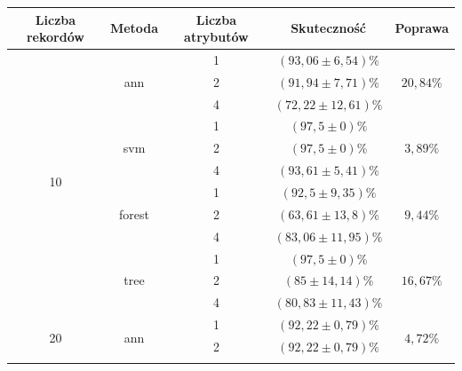 \begin{table}[]
\tiny
\centering
\begin{tabular}{|c|c|c|c|c|}
\hline
Liczba rekordów       & Metoda                  & Liczba atrybutów & Skuteczność & Poprawa \\ \hline
\multirow{12}{*}{10}  & \multirow{3}{*}{ann}    & 1                & $ (93,06  \pm  6,54) \% $ & \multirow{3}{*}{$20,84\%$} \\ \cline{3-4} 
                      &                         & 2                & $ (91,94 \pm 7,71) \% $   & \\ \cline{3-4} 
                      &                         & 4                & $ (72,22 \pm 12,61) \% $  & \\ \cline{2-5} 
                      & \multirow{3}{*}{svm}    & 1                & $ (97,5 \pm 0) \% $        & \multirow{3}{*}{$3,89 \%$} \\ \cline{3-4} 
                      &                         & 2                & $ (97,5 \pm 0) \% $       &\\ \cline{3-4} 
                      &                         & 4                & $ (93,61 \pm 5,41) \% $   &\\ \cline{2-5} 
                      & \multirow{3}{*}{forest} & 1                & $ (92,5 \pm 9,35) \% $    & \multirow{3}{*}{$9,44\%$} \\ \cline{3-4} 
                      &                         & 2                & $ (63,61 \pm 13,8) \% $   &\\ \cline{3-4} 
                      &                         & 4                & $ (83,06 \pm 11,95) \% $ & \\ \cline{2-5} 
                      & \multirow{3}{*}{tree}   & 1                & $ (97,5 \pm 0) \% $       & \multirow{3}{*}{$16,67\%$} \\ \cline{3-4} 
                      &                         & 2                & $ (85 \pm  14,14) \% $    & \\ \cline{3-4} 
                      &                         & 4                & $ (80,83 \pm 11,43) \% $  &\\ \hline
\multirow{12}{*}{20}  & \multirow{3}{*}{ann}    & 1                & $ (92,22 \pm 0,79) \% $   & \multirow{3}{*}{$4,72\%$} \\ \cline{3-4} 
                      &                         & 2                & $ (92,22 \pm 0,79) \% $   &\\ \cline{3-4} 

\end{tabular}
\end{table}
